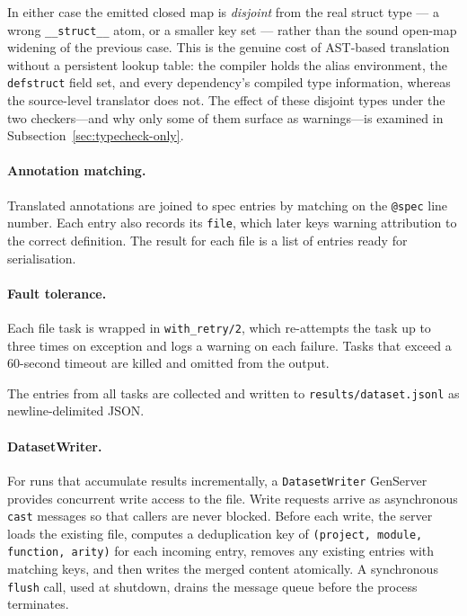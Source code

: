 In either case the emitted closed map is \emph{disjoint} from the real struct type --- a wrong \texttt{\_\_struct\_\_} atom, or a smaller key set --- rather than the sound open-map widening of the previous case. 
This is the genuine cost of AST-based translation without a persistent lookup table: the compiler holds the alias environment, the \texttt{defstruct} field set, and every dependency's compiled type information, whereas the source-level translator does not. 
The effect of these disjoint types under the two checkers---and why only some of them surface as warnings---is examined in Subsection~\ref{sec:typecheck-only}.

\paragraph{Annotation matching.}
Translated annotations are joined to spec entries by matching on the \texttt{@spec} line number.
Each entry also records its \texttt{file}, which later keys warning attribution to the correct definition.
The result for each file is a list of entries ready for serialisation.

\paragraph{Fault tolerance.}
Each file task is wrapped in \texttt{with\_retry/2}, which re-attempts the task up to three times on exception and logs a warning on each failure.
Tasks that exceed a 60-second timeout are killed and omitted from the output.

The entries from all tasks are collected and written to \texttt{results/dataset.jsonl} as newline-delimited JSON.

\paragraph{DatasetWriter.}
For runs that accumulate results incrementally, a \texttt{DatasetWriter} GenServer provides concurrent write access to the file.
Write requests arrive as asynchronous \texttt{cast} messages so that callers are never blocked.
Before each write, the server loads the existing file, computes a deduplication key of \texttt{(project, module, function, arity)} for each incoming entry, removes any existing entries with matching keys, and then writes the merged content atomically.
A synchronous \texttt{flush} call, used at shutdown, drains the message queue before the process terminates.

